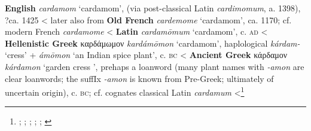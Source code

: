 \begin{etymology}\label{ety:cardamom}
\textbf{English} \textit{cardamom} `cardamom', (via post-classical Latin \textit{cardimomum}, a. 1398), ?ca. 1425
< later also from \textbf{Old French} \textit{cardemome} `cardamom', ca. 1170; cf. modern French \textit{cardamome}
< \textbf{Latin} \textit{cardamōmum} `cardamom',  c. \textsc{ad}
< \textbf{Hellenistic Greek} {καρδάμωμον} \textit{kardámōmon} `cardamom', haplological  \textit{kárdam-} `cress' +  \textit{ámōmon} `an Indian spice plant',  c. \textsc{bc}
< \textbf{Ancient Greek} {κάρδαμον} \textit{kárdamon} `garden cress ', prehaps a loanword (many plant names with \textit{-amon} are clear loanwords; the suffIx \textit{-amon} is known from Pre-Greek; ultimately of uncertain origin),  c. \textsc{bc}; cf. cognates classical Latin \textit{cardamum}
<\footnote{\textcite[s.v. cardamom]{oed}; \textcite[s.v. cardamome]{tlfi}; \textcite[s.v. cardamomum]{lewis_latin_1879}; \textcite[s.v. καρδάμωμον]{liddell_greek-english_1940}; \textcite[s.v. κάρδαμον]{liddell_greek-english_1940}; \textcite[644]{beekes_etymological_2010}}
\end{etymology}